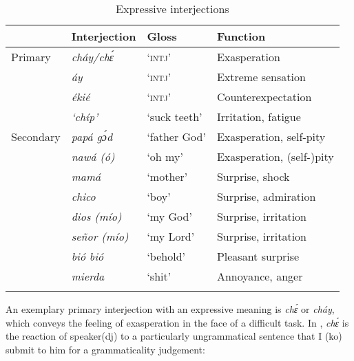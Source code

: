 \begin{table}
\caption{Expressive interjections}
\label{tab:key:12.2}

\begin{tabularx}{\textwidth}{Xlll}
\lsptoprule
 & Interjection & Gloss & Function\\
\midrule
 Primary & \itshape cháy/chɛ́ & ‘\textsc{intj}’ & Exasperation\\
& \itshape áy & ‘\textsc{intj}’ & Extreme sensation\\
& \itshape ékié & ‘\textsc{intj}’ & Counterexpectation\\
& \itshape ‘chíp’ & ‘suck teeth’ & Irritation, fatigue\\

\tablevspace
Secondary & \itshape papá gɔ́d & ‘father God’ & Exasperation, self-pity\\
& \itshape nawá (ó) & ‘oh my’ & Exasperation, (self-)pity \\
& \itshape mamá & ‘mother’ & Surprise, shock\\
& \itshape chico & ‘boy’ & Surprise, admiration\\
& \itshape dios (mío) & ‘my God’ & Surprise, irritation\\
& \itshape señor (mío) & ‘my Lord’ & Surprise, irritation\\
& \itshape bió bió & ‘behold’ & Pleasant surprise\\
& \itshape mierda & ‘shit’ & Annoyance, anger\\
\lspbottomrule
\end{tabularx}
\end{table}
An exemplary primary interjection with an expressive meaning is \textit{chɛ́} or \textit{cháy}, which conveys the feeling of exasperation in the face of a difficult task. In , \textit{chɛ́} is the reaction of speaker(dj) to a particularly ungrammatical sentence that I (ko) submit to him for a grammaticality judgement:


\ea%
    \label{ex:key:1636}
\z\z


